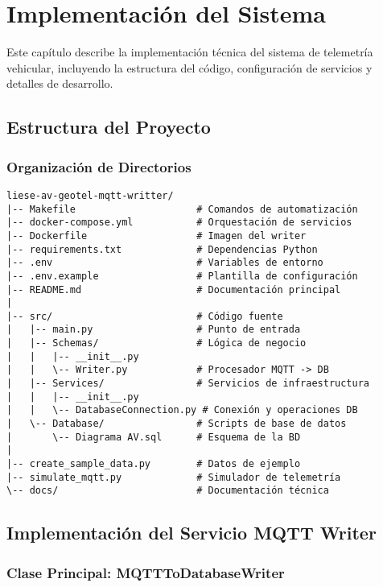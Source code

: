 \chapter{Implementación del Sistema}
\label{chap:implementacion}

Este capítulo describe la implementación técnica del sistema de telemetría vehicular, incluyendo la estructura del código, configuración de servicios y detalles de desarrollo.

\section{Estructura del Proyecto}

\subsection{Organización de Directorios}

\begin{verbatim}
liese-av-geotel-mqtt-writter/
|-- Makefile                     # Comandos de automatización
|-- docker-compose.yml           # Orquestación de servicios
|-- Dockerfile                   # Imagen del writer
|-- requirements.txt             # Dependencias Python
|-- .env                         # Variables de entorno
|-- .env.example                 # Plantilla de configuración
|-- README.md                    # Documentación principal
|
|-- src/                         # Código fuente
|   |-- main.py                  # Punto de entrada
|   |-- Schemas/                 # Lógica de negocio
|   |   |-- __init__.py
|   |   \-- Writer.py            # Procesador MQTT -> DB
|   |-- Services/                # Servicios de infraestructura
|   |   |-- __init__.py
|   |   \-- DatabaseConnection.py # Conexión y operaciones DB
|   \-- Database/                # Scripts de base de datos
|       \-- Diagrama AV.sql      # Esquema de la BD
|
|-- create_sample_data.py        # Datos de ejemplo
|-- simulate_mqtt.py             # Simulador de telemetría
\-- docs/                        # Documentación técnica
\end{verbatim}

\section{Implementación del Servicio MQTT Writer}

\subsection{Clase Principal: MQTTToDatabaseWriter}

